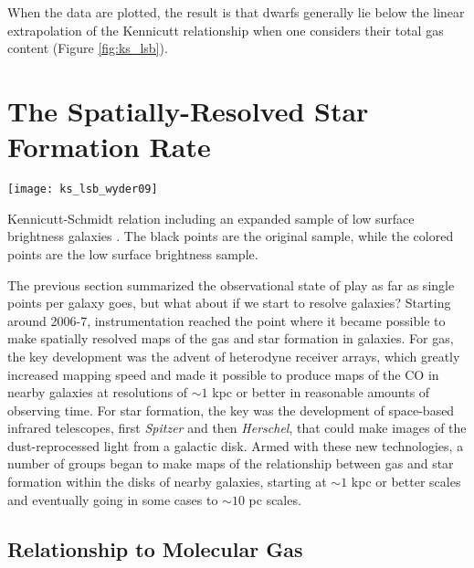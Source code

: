When the data are plotted, the result is that dwarfs generally lie below the linear extrapolation of the Kennicutt relationship when one considers their total gas content (Figure \ref{fig:ks_lsb}).

\section{The Spatially-Resolved Star Formation Rate}

\begin{marginfigure}
\texttt{[image: ks\_lsb\_wyder09]}
\caption[Kennicutt-Schmidt relation, with additional low surface brightness sample]{
\label{fig:ks_lsb}
Kennicutt-Schmidt relation including an expanded sample of low surface brightness galaxies \citet{wyder09a}. The black points are the original \citet{kennicutt98a} sample, while the colored points are the low surface brightness sample.
}
\end{marginfigure}

The previous section summarized the observational state of play as far as single points per galaxy goes, but what about if we start to resolve galaxies? Starting around 2006-7, instrumentation reached the point where it became possible to make spatially resolved maps of the gas and star formation in galaxies. For gas, the key development was the advent of heterodyne receiver arrays, which greatly increased mapping speed and made it possible to produce maps of the CO in nearby galaxies at resolutions of $\sim 1$ kpc or better in reasonable amounts of observing time. For star formation, the key was the development of space-based infrared telescopes, first \textit{Spitzer} and then \textit{Herschel}, that could make images of the dust-reprocessed light from a galactic disk. Armed with these new technologies, a number of groups began to make maps of the relationship between gas and star formation within the disks of nearby galaxies, starting at $\sim 1$ kpc or better scales and eventually going in some cases to $\sim 10$ pc scales.

\subsection{Relationship to Molecular Gas}

